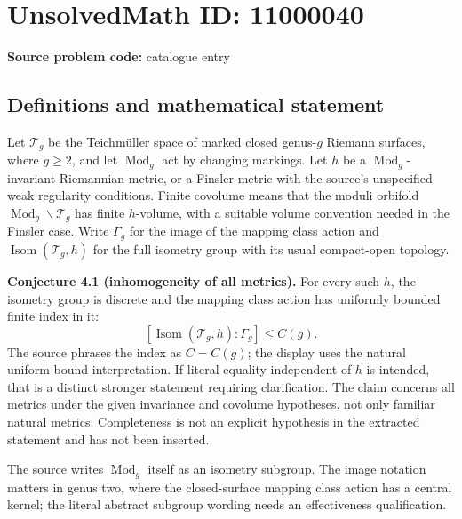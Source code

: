 \documentclass[11pt]{article}
\begin{document}
\section*{UnsolvedMath ID: 11000040}
\textbf{Source problem code:} catalogue entry
\subsection{Definitions and mathematical statement}
Let $\mathcal T_g$ be the Teichm\"uller space of marked closed genus-$g$ Riemann surfaces, where $g\ge2$, and let $\operatorname{Mod}_g$ act by changing markings. Let $h$ be a $\operatorname{Mod}_g$-invariant Riemannian metric, or a Finsler metric with the source's unspecified weak regularity conditions. Finite covolume means that the moduli orbifold $\operatorname{Mod}_g\backslash\mathcal T_g$ has finite $h$-volume, with a suitable volume convention needed in the Finsler case. Write $\Gamma_g$ for the image of the mapping class action and $\operatorname{Isom}(\mathcal T_g,h)$ for the full isometry group with its usual compact-open topology.

\textbf{Conjecture 4.1 (inhomogeneity of all metrics).} For every such $h$, the isometry group is discrete and the mapping class action has uniformly bounded finite index in it:
\[
 [\operatorname{Isom}(\mathcal T_g,h):\Gamma_g]\le C(g).
\]
The source phrases the index as $C=C(g)$; the display uses the natural uniform-bound interpretation. If literal equality independent of $h$ is intended, that is a distinct stronger statement requiring clarification. The claim concerns all metrics under the given invariance and covolume hypotheses, not only familiar natural metrics. Completeness is not an explicit hypothesis in the extracted statement and has not been inserted.

The source writes $\operatorname{Mod}_g$ itself as an isometry subgroup. The image notation matters in genus two, where the closed-surface mapping class action has a central kernel; the literal abstract subgroup wording needs an effectiveness qualification.
\end{document}
